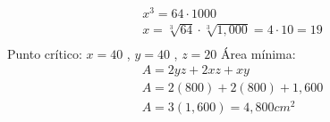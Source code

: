 \begin{enumerate}
\begin{center}
\begin{align*}
            x^3 = 64\cdot1000 \\ 
            x = \sqrt[3]{64}\cdot \sqrt[3]{1,000} = 4\cdot 10 = 19 \\  
        \end{align*}
        Punto crítico: $\displaystyle x=40$ , $\displaystyle y=40$ , $\displaystyle z=20$ \newline 
        Área mínima:
        \begin{align*}
            A = 2yz+2xz+xy \\ 
            A = 2(800) + 2(800) + 1,600 \\ 
            A = 3(1,600) = 4,800 cm^2 \\ 
        \end{align*}
    \end{center}
\end{enumerate}


